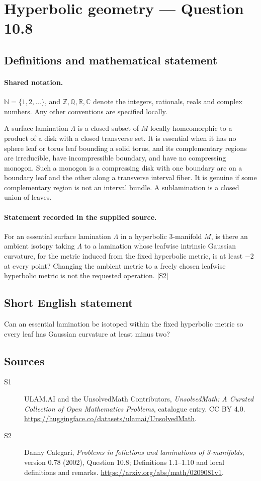 \documentclass[11pt]{article}
\newcommand{\sref}[2]{\hyperlink{source:#1:#2}{[S#2]}}
\begin{document}
\section{Hyperbolic geometry — Question 10.8}\label{statement}

\subsection{Definitions and mathematical statement}

\paragraph{Shared notation.}$\mathbb N=\{1,2,\ldots\}$, and $\mathbb Z,\mathbb Q,\mathbb R,\mathbb C$ denote the integers, rationals, reals and complex numbers. Any other conventions are specified locally.


A surface lamination $\Lambda$ is a closed subset of $M$ locally homeomorphic to a product of a disk with a closed transverse set. It is essential when it has no sphere leaf or torus leaf bounding a solid torus, and its complementary regions are irreducible, have incompressible boundary, and have no compressing monogon. Such a monogon is a compressing disk with one boundary arc on a boundary leaf and the other along a transverse interval fiber. It is genuine if some complementary region is not an interval bundle. A sublamination is a closed union of leaves.
\paragraph{Statement recorded in the supplied source.}
For an essential surface lamination $\Lambda$ in a hyperbolic $3$-manifold $M$, is there an ambient isotopy taking $\Lambda$ to a lamination whose leafwise intrinsic Gaussian curvature, for the metric induced from the fixed hyperbolic metric, is at least $-2$ at every point? Changing the ambient metric to a freely chosen leafwise hyperbolic metric is not the requested operation. \sref{statement}{2}
\subsection{Short English statement}
Can an essential lamination be isotoped within the fixed hyperbolic metric so every leaf has Gaussian curvature at least minus two?
\subsection{Sources}
\begin{description}
\item[\hypertarget{source:statement:1}{S1}] ULAM.AI and the UnsolvedMath Contributors, \emph{UnsolvedMath: A Curated Collection of Open Mathematics Problems}, catalogue entry. CC BY 4.0. \url{https://huggingface.co/datasets/ulamai/UnsolvedMath}.
\item[\hypertarget{source:statement:2}{S2}] Danny Calegari, \emph{Problems in foliations and laminations of 3-manifolds}, version 0.78 (2002), Question 10.8; Definitions 1.1--1.10 and local definitions and remarks. \url{https://arxiv.org/abs/math/0209081v1}.
\end{description}
\label{end:statement}
\end{document}
